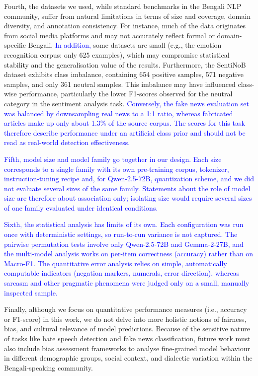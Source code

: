 \documentclass[10pt,letterpaper]{article}
\newcommand{\rev}[1]{\textcolor{blue}{#1}}
\begin{document}
Fourth, the datasets we used, while standard benchmarks in the Bengali NLP community, suffer from natural limitations in terms of size and coverage, domain diversity, and annotation consistency. For instance, much of the data originates from social media platforms and may not accurately reflect formal or domain-specific Bengali. \rev{In addition,} some datasets are small (e.g., the emotion recognition corpus: only 625 examples), which may compromise statistical stability and the generalisation value of the results. Furthermore, the SentiNoB dataset exhibits class imbalance, containing 654 positive samples, 571 negative samples, and only 361 neutral samples. This imbalance may have influenced class-wise performance, particularly the lower F1-scores observed for the neutral category in the sentiment analysis task. \rev{Conversely, the fake news evaluation set was balanced by downsampling real news to a 1:1 ratio, whereas fabricated articles make up only about 1.3\% of the source corpus. The scores for this task therefore describe performance under an artificial class prior and should not be read as real-world detection effectiveness.}

\rev{Fifth, model size and model family go together in our design. Each size corresponds to a single family with its own pre-training corpus, tokenizer, instruction-tuning recipe and, for Qwen-2.5-72B, quantization scheme, and we did not evaluate several sizes of the same family. Statements about the role of model size are therefore about association only; isolating size would require several sizes of one family evaluated under identical conditions.}

\rev{Sixth, the statistical analysis has limits of its own. Each configuration was run once with deterministic settings, so run-to-run variance is not captured. The pairwise permutation tests involve only Qwen-2.5-72B and Gemma-2-27B, and the multi-model analysis works on per-item correctness (accuracy) rather than on Macro-F1. The quantitative error analysis relies on simple, automatically computable indicators (negation markers, numerals, error direction), whereas sarcasm and other pragmatic phenomena were judged only on a small, manually inspected sample.}


Finally, although we focus on quantitative performance measures (i.e., accuracy or F1-score) in this work, we do not delve into more holistic notions of fairness, bias, and cultural relevance of model predictions. Because of the sensitive nature of tasks like hate speech detection and fake news classification, future work must also include bias assessment frameworks to analyse fine-grained model behaviour in different demographic groups, social context, and dialectic variation within the Bengali-speaking community.
\end{document}
